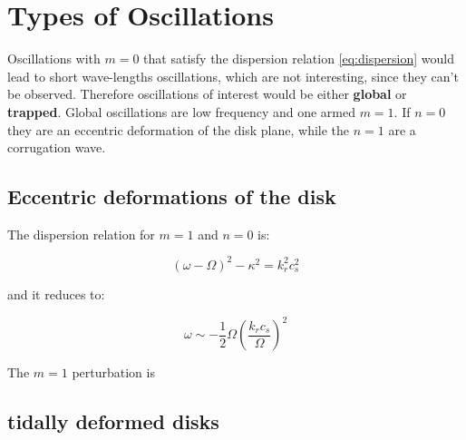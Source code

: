 \section{Types of Oscillations}

Oscillations with $m=0$ that satisfy the dispersion relation
\ref{eq:dispersion} would lead to short wave-lengths oscillations,
which are not interesting, since they can't be observed. Therefore
oscillations of interest would be either \textbf{global} or
\textbf{trapped}. Global oscillations are low frequency and
one armed $m=1$. If $n=0$ they are an eccentric deformation of the 
disk plane, while the $n=1$ are a corrugation wave.

\subsection{Eccentric deformations of the disk}

The dispersion relation for $m=1$ and $n=0$ is:

\begin{equation}
(\omega - \Omega)^2 - \kappa^2 = k_r^2c_s^2
\end{equation}

and it reduces to:

\begin{equation}
\omega \sim - \dfrac{1}{2} \Omega \left( \dfrac{k_r
c_s}{\Omega}\right)^2
\end{equation}

The $m=1$ perturbation is

\subsection{tidally deformed disks}

